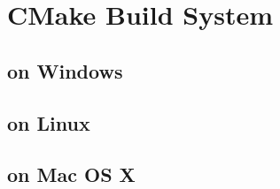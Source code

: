 \section{CMake Build System}

\subsection{on Windows}

\subsection{on Linux}

\subsection{on Mac OS X} 
